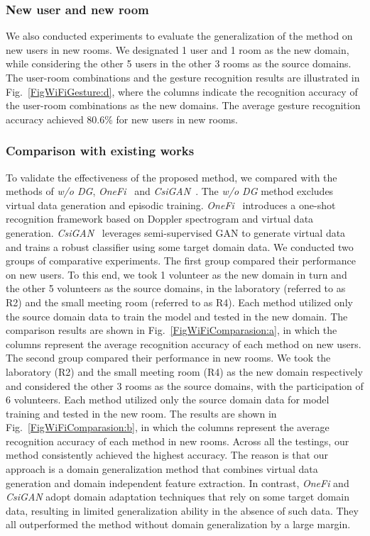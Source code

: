 \documentclass[journal]{IEEEtran}
\begin{document}
\subsubsection{New user and new room}
We also conducted experiments to evaluate the generalization of the method on new users in new rooms. We designated 1 user and 1 room as the new domain, while considering the other 5 users in the other 3 rooms as the source domains. The user-room combinations and the gesture recognition results are illustrated in Fig.~\ref{FigWiFiGesture:d}, where the columns indicate the recognition accuracy of the user-room combinations as the new domains. The average gesture recognition accuracy achieved 80.6\% for new users in new rooms. 

\subsubsection{Comparison with existing works}
To validate the effectiveness of the proposed method, we compared with the methods of \textit{w/o DG}, \textit{OneFi}~\cite{XiaoR:2021} and \textit{CsiGAN}~\cite{XiaoCJ:2019}. The \textit{w/o DG} method excludes virtual data generation and episodic training. \textit{OneFi}~\cite{XiaoR:2021} introduces a one-shot recognition framework based on Doppler spectrogram and virtual data generation. \textit{CsiGAN}~\cite{XiaoCJ:2019} leverages semi-supervised GAN to generate virtual data and trains a robust classifier using some target domain data. We conducted two groups of comparative experiments. The first group compared their performance on new users. To this end, we took 1 volunteer as the new domain in turn and the other 5 volunteers as the source domains, in the laboratory (referred to as R2) and the small meeting room (referred to as R4). Each method utilized only the source domain data to train the model and tested in the new domain. The comparison results are shown in Fig.~\ref{FigWiFiComparasion:a}, in which the columns represent the average recognition accuracy of each method on new users. The second group compared their performance in new rooms. We took the laboratory (R2) and the small meeting room (R4) as the new domain respectively and considered the other 3 rooms as the source domains, with the participation of 6 volunteers. Each method utilized only the source domain data for model training and tested in the new room. The results are shown in Fig.~\ref{FigWiFiComparasion:b}, in which the columns represent the average recognition accuracy of each method in new rooms. Across all the testings, our method consistently achieved the highest accuracy. The reason is that our approach is a domain generalization method that combines virtual data generation and domain independent feature extraction. In contrast, \textit{OneFi} and \textit{CsiGAN} adopt domain adaptation techniques that rely on some target domain data, resulting in limited generalization ability in the absence of such data. They all outperformed the method without domain generalization by a large margin.  
\end{document}

